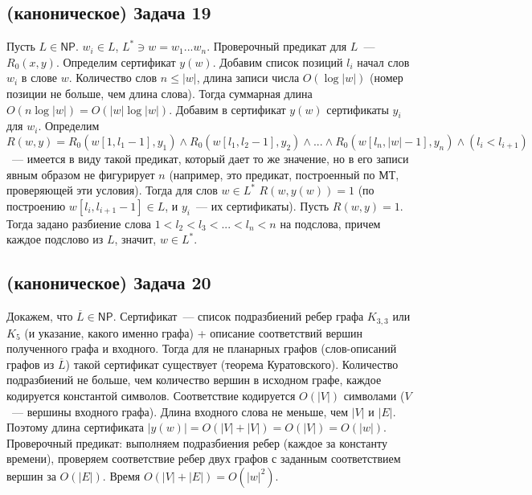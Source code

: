 \documentclass[a4paper]{article}
\def\NP{{\mathsf{NP}}}
\begin{document}
\subsection*{(каноническое) Задача 19}
Пусть $L\in\NP$. $w_i\in L$, $L^*\ni w=w_1...w_n$. Проверочный предикат для $L$~--- $R_0(x,y)$. Определим сертификат $y(w)$. Добавим список позиций $l_i$ начал слов $w_i$ в слове $w$. Количество слов $n\leqslant |w|$, длина записи числа $O(\log |w|)$ (номер позиции не больше, чем длина слова). Тогда суммарная длина $O(n\log|w|)=O(|w|\log|w|)$. Добавим в сертификат $y(w)$ сертификаты $y_i$ для $w_i$. Определим $R(w,y)=R_0(w[1,l_1-1],y_1)\wedge R_0(w[l_1,l_2-1],y_2)\wedge...\wedge R_0(w[l_n,|w|-1],y_n)\wedge (l_i<l_{i+1})$~--- имеется в виду такой предикат, который дает то же значение, но в его записи явным образом не фигурирует $n$ (например, это предикат, построенный по МТ, проверяющей эти условия). Тогда для слов $w\in L^*$ $R(w,y(w))=1$ (по построению $w[l_i,l_{i+1}-1]\in L$, и $y_i$~--- их сертификаты). Пусть $R(w,y)=1$. Тогда задано разбиение слова $1<l_2<l_3<...<l_n<n$ на подслова, причем каждое подслово из $L$, значит, $w\in L^*$.
\subsection*{(каноническое) Задача 20}
Докажем, что $\overline{L}\in\NP$. Сертификат~--- список подразбиений ребер графа $K_{3,3}$ или $K_5$ (и указание, какого именно графа) + описание соответствий вершин полученного графа и входного. Тогда для не планарных графов (слов-описаний графов из $\overline{L}$) такой сертификат существует (теорема Куратовского). Количество подразбиений не больше, чем количество вершин в исходном графе, каждое кодируется константой символов. Соответствие кодируется $O(|V|)$ символами ($V$~--- вершины входного графа). Длина входного слова не меньше, чем $|V|$ и $|E|$. Поэтому длина сертификата $|y(w)|=O(|V|+|V|)=O(|V|)=O(|w|)$. Проверочный предикат: выполняем подразбиения ребер (каждое за константу времени), проверяем соответствие ребер двух графов с заданным соответствием вершин за $O(|E|)$. Время $O(|V|+|E|)=O(|w|^2)$.
\end{document}
